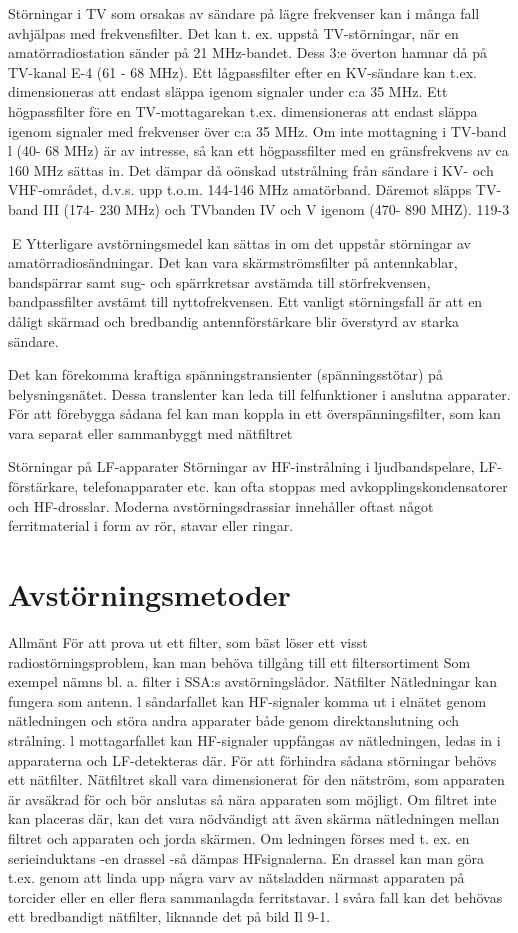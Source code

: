 Störningar i TV som orsakas av sändare
på lägre frekvenser kan i många fall avhjälpas med frekvensfilter. Det kan t. ex. uppstå
TV-störningar, när en amatörradiostation
sänder på 21 MHz-bandet. Dess 3:e överton
hamnar då på TV-kanal E-4 (61 - 68 MHz).
Ett lågpassfilter efter en KV-sändare kan
t.ex. dimensioneras att endast släppa igenom signaler under c:a 35 MHz.
Ett högpassfilter före en TV-mottagarekan t.ex. dimensioneras att endast släppa
igenom signaler med frekvenser över c:a 35
MHz.
Om inte mottagning i TV-band l (40- 68
MHz) är av intresse, så kan ett högpassfilter
med en gränsfrekvens av ca 160 MHz sättas
in. Det dämpar då oönskad utstrålning från
sändare i KV- och VHF-området, d.v.s. upp
t.o.m. 144-146 MHz amatörband. Däremot
släpps TV-band III (174- 230 MHz) och TVbanden IV och V igenom (470- 890 MHZ).
119-3

E
Ytterligare avstörningsmedel kan sättas
in om det uppstår störningar av amatörradiosändningar. Det kan vara skärmströmsfilter
på antennkablar, bandspärrar samt sug- och
spärrkretsar avstämda till störfrekvensen,
bandpassfilter avstämt till nyttofrekvensen.
Ett vanligt störningsfall är att en dåligt
skärmad och bredbandig antennförstärkare
blir överstyrd av starka sändare.

Det kan förekomma kraftiga spänningstransienter (spänningsstötar) på belysningsnätet. Dessa translenter kan leda till felfunktioner i anslutna apparater. För att förebygga
sådana fel kan man koppla in ett överspänningsfilter, som kan vara separat eller sammanbyggt med nätfiltret

Störningar på LF-apparater
Störningar av HF-instrålning i ljudbandspelare, LF-förstärkare, telefonapparater etc. kan
ofta stoppas med avkopplingskondensatorer och HF-drosslar. Moderna avstörningsdrassiar innehåller oftast något ferritmaterial
i form av rör, stavar eller ringar.

\section{Avstörningsmetoder}

Allmänt
För att prova ut ett filter, som bäst löser ett
visst radiostörningsproblem, kan man behöva tillgång till ett filtersortiment
Som exempel nämns bl. a. filter i SSA:s
avstörningslådor.
Nätfilter
Nätledningar kan fungera som antenn. l
såndarfallet kan HF-signaler komma ut i
elnätet genom nätledningen och störa andra
apparater både genom direktanslutning och
strålning. l mottagarfallet kan HF-signaler
uppfångas av nätledningen, ledas in i apparaterna och LF-detekteras där. För att förhindra sådana störningar behövs ett nätfilter.
Nätfiltret skall vara dimensionerat för den
nätström, som apparaten är avsäkrad för och
bör anslutas så nära apparaten som möjligt.
Om filtret inte kan placeras där, kan det vara
nödvändigt att även skärma nätledningen
mellan filtret och apparaten och jorda skärmen.
Om ledningen förses med t. ex. en serieinduktans -en drassel -så dämpas HFsignalerna. En drassel kan man göra t.ex.
genom att linda upp några varv av nätsladden
närmast apparaten på torcider eller en eller
flera sammanlagda ferritstavar. l svåra fall
kan det behövas ett bredbandigt nätfilter,
liknande det på bild Il 9-1.

